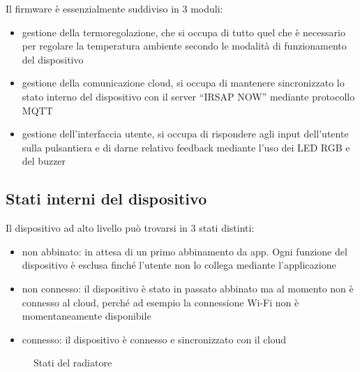 \documentclass{article}
\begin{document}
Il firmware è essenzialmente suddiviso in 3 moduli:

\begin{itemize}
    \item gestione della termoregolazione, che si occupa di tutto quel che è necessario
        per regolare la temperatura ambiente secondo le modalità di funzionamento del dispositivo
    \item gestione della comunicazione cloud, si occupa di mantenere sincronizzato lo stato
        interno del dispositivo con il server ``IRSAP NOW'' mediante protocollo MQTT
    \item gestione dell'interfaccia utente, si occupa di rispondere agli input dell'utente
        sulla pulsantiera e di darne relativo feedback mediante l'uso dei LED RGB e del buzzer
\end{itemize}

\subsection{Stati interni del dispositivo}

Il dispositivo ad alto livello può trovarsi in 3 stati distinti:

\begin{itemize}
    \item non abbinato: in attesa di un primo abbinamento da app. Ogni funzione del
        dispositivo è esclusa finché l'utente non lo collega mediante l'applicazione
    \item non connesso: il dispositivo è stato in passato abbinato ma al momento non è
        connesso al cloud, perché ad esempio la connessione Wi-Fi non è momentaneamente disponibile
    \item connesso: il dispositivo è connesso e sincronizzato con il cloud
\end{itemize}

\begin{figure}[ht]
    \centering
    \caption{Stati del radiatore}
    \label{stati}
\end{figure}
\end{document}

